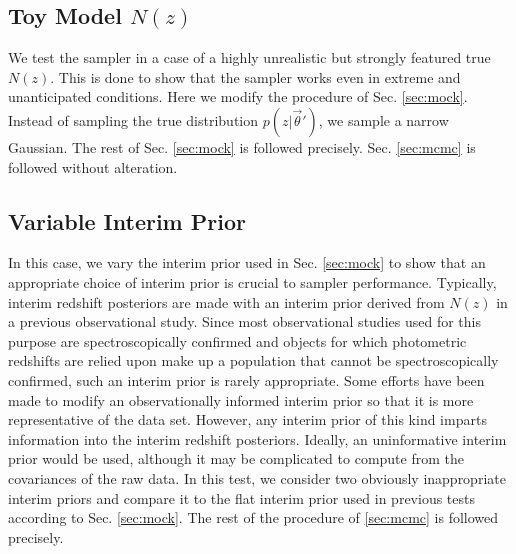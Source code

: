 \documentclass[preprint]{aastex}
\begin{document}
\begin{figure}
\caption{}
\label{fig:multipzs}
\end{figure}


\clearpage
\subsection{Toy Model $N(z)$}
\label{sec:fake}

We test the sampler in a case of a highly unrealistic but strongly featured 
true $N(z)$.  This is done to show that the sampler works even in extreme and 
unanticipated conditions.  Here we modify the procedure of Sec. \ref{sec:mock}. 
 Instead of sampling the true distribution $p(z|\vec{\theta}')$, we sample a 
narrow Gaussian.  The rest of Sec. \ref{sec:mock} is followed precisely.  Sec. 
\ref{sec:mcmc} is followed without alteration.

\begin{figure}
\caption{}
\label{fig:dumbestparam}
\end{figure}

\clearpage
\subsection{Variable Interim Prior}
\label{sec:interim}

In this case, we vary the interim prior used in Sec. \ref{sec:mock} to show 
that an appropriate choice of interim prior is crucial to sampler performance.  
Typically, interim redshift posteriors are made with an interim prior derived 
from $N(z)$ in a previous observational study.  Since most observational 
studies used for this purpose are spectroscopically confirmed and objects for 
which photometric redshifts are relied upon make up a population that cannot be 
spectroscopically confirmed, such an interim prior is rarely appropriate.  Some 
efforts have been made to modify an observationally informed interim prior so 
that it is more representative of the data set.  \citep{she11}  However, any 
interim prior of this kind imparts information into the interim redshift 
posteriors.  Ideally, an uninformative interim prior would be used, although it 
may be complicated to compute from the covariances of the raw data.  In this 
test, we consider two obviously inappropriate interim priors and compare it to 
the flat interim prior used in previous tests according to Sec. \ref{sec:mock}. 
 The rest of the procedure of \ref{sec:mcmc} is followed precisely.
\end{document}
